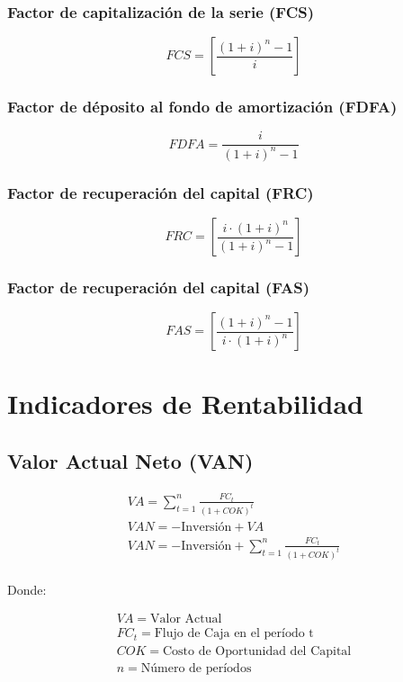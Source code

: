 \documentclass[a4paper, twocolumn]{article}
\begin{document}
\subsubsection{Factor de capitalización de la serie (FCS)}

$$ FCS = [\frac{(1 + i)^n - 1}{i}] $$

\subsubsection{Factor de déposito al fondo de amortización (FDFA)}

$$ FDFA = \frac{i}{(1 + i)^n - 1} $$

\subsubsection{Factor de recuperación del capital (FRC)}

$$ FRC = [\frac{i \cdot (1 + i)^n}{(1 + i)^n - 1}] $$

\subsubsection{Factor de recuperación del capital (FAS)}

$$ FAS = [\frac{(1 + i)^n - 1}{i \cdot (1 + i)^n}] $$

\section{Indicadores de Rentabilidad}

\subsection{Valor Actual Neto (VAN)}

\begin{gather*}
    VA = \sum_{t = 1}^{n} \frac{FC_t}{(1 + COK)^t} \\
    VAN = - \text{Inversión} + VA \\
    VAN = - \text{Inversión} + \sum_{t = 1}^{n} \frac{FC_t}{(1 + COK)^t} \\
\end{gather*}

Donde:

\begin{gather*}
    VA = \text{Valor Actual} \\
    FC_t = \text{Flujo de Caja en el período t} \\
    COK = \text{Costo de Oportunidad del Capital} \\
    n = \text{Número de períodos} \\
\end{gather*}
\end{document}

